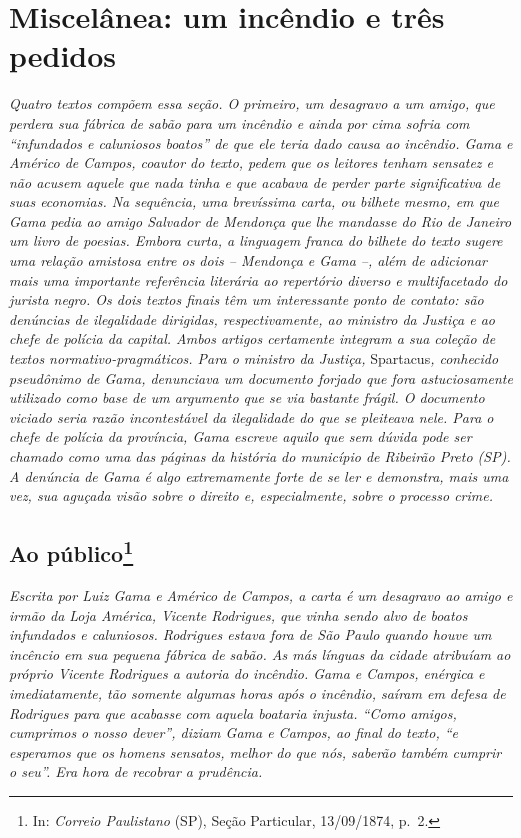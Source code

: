 \part{Miscelânea: um incêndio e três pedidos}

\begin{didascalia}
\emph{Quatro textos compõem essa seção. O primeiro, um desagravo a um
amigo, que perdera sua fábrica de sabão para um incêndio e ainda por
cima sofria com ``infundados e caluniosos boatos'' de que ele teria dado
causa ao incêndio. Gama e Américo de Campos, coautor do texto, pedem que
os leitores tenham sensatez e não acusem aquele que nada tinha e que
acabava de perder parte significativa de suas economias. Na sequência,
uma brevíssima carta, ou bilhete mesmo, em que Gama pedia ao amigo
Salvador de Mendonça que lhe mandasse do Rio de Janeiro um livro de
poesias. Embora curta, a linguagem franca do bilhete do texto sugere uma
relação amistosa entre os dois -- Mendonça e Gama --, além de adicionar
mais uma importante referência literária ao repertório diverso e
multifacetado do jurista negro. Os dois textos finais têm um
interessante ponto de contato: são denúncias de ilegalidade dirigidas,
respectivamente, ao ministro da Justiça e ao chefe de polícia da
capital. Ambos artigos certamente integram a sua coleção de textos
normativo-pragmáticos. Para o ministro da Justiça,} Spartacus\emph{,
conhecido pseudônimo de Gama, denunciava um documento forjado que fora
astuciosamente utilizado como base de um argumento que se via bastante
frágil. O documento viciado seria razão incontestável da ilegalidade do
que se pleiteava nele. Para o chefe de polícia da província, Gama
escreve aquilo que sem dúvida pode ser chamado como uma das páginas da
história do município de Ribeirão Preto (SP). A denúncia de Gama é algo
extremamente forte de se ler e demonstra, mais uma vez, sua aguçada
visão sobre o direito e, especialmente, sobre o processo crime.}
\end{didascalia}

\chapter{Ao público\footnote{ In: \emph{Correio Paulistano} (SP), Seção Particular,
  13/09/1874, p.~2.}} %

\begin{didascalia}
\emph{Escrita por Luiz Gama e Américo de Campos, a carta é um desagravo
ao amigo e irmão da Loja América, Vicente Rodrigues, que vinha sendo
alvo de boatos infundados e caluniosos. Rodrigues estava fora de São
Paulo quando houve um incêncio em sua pequena fábrica de sabão. As más
línguas da cidade atribuíam ao próprio Vicente Rodrigues a autoria do
incêndio. Gama e Campos, enérgica e imediatamente, tão somente algumas
horas após o incêndio, saíram em defesa de Rodrigues para que acabasse
com aquela boataria injusta. ``Como amigos, cumprimos o nosso dever'',
diziam Gama e Campos, ao final do texto, ``e esperamos que os homens
sensatos, melhor do que nós, saberão também cumprir o seu''. Era hora de
recobrar a prudência.}
\end{didascalia}

